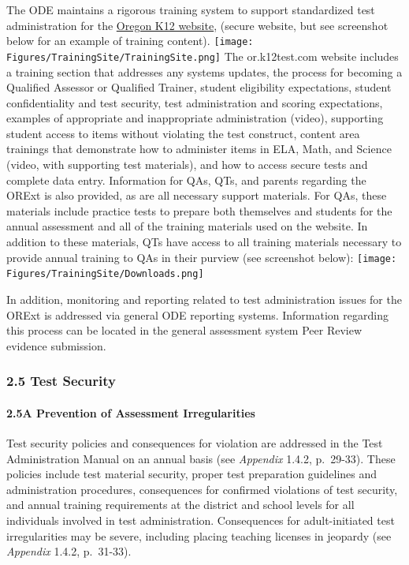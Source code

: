 \documentclass[]{article}
\let\oldparagraph\paragraph
\renewcommand{\paragraph}[1]{\oldparagraph{#1}\mbox{}}
\begin{document}
The ODE maintains a rigorous training system to support standardized
test administration for the \color{link}
\href{https://or.k12test.com}{Oregon K12 website}\color{black}, (secure
website, but see screenshot below for an example of training content).
\FloatBarrier \texttt{[image: Figures/TrainingSite/TrainingSite.png]}
\clearpage The or.k12test.com website includes a training section that
addresses any systems updates, the process for becoming a Qualified
Assessor or Qualified Trainer, student eligibility expectations, student
confidentiality and test security, test administration and scoring
expectations, examples of appropriate and inappropriate administration
(video), supporting student access to items without violating the test
construct, content area trainings that demonstrate how to administer
items in ELA, Math, and Science (video, with supporting test materials),
and how to access secure tests and complete data entry. Information for
QAs, QTs, and parents regarding the ORExt is also provided, as are all
necessary support materials. For QAs, these materials include practice
tests to prepare both themselves and students for the annual assessment
and all of the training materials used on the website. In addition to
these materials, QTs have access to all training materials necessary to
provide annual training to QAs in their purview (see screenshot below):
\FloatBarrier  \texttt{[image: Figures/TrainingSite/Downloads.png]}

In addition, monitoring and reporting related to test administration
issues for the ORExt is addressed via general ODE reporting systems.
Information regarding this process can be located in the general
assessment system Peer Review evidence submission.

\hypertarget{test-security}{%
\subsubsection{2.5 Test Security}\label{test-security}}

\hypertarget{a-prevention-of-assessment-irregularities}{%
\paragraph{2.5A Prevention of Assessment
Irregularities}\label{a-prevention-of-assessment-irregularities}}

Test security policies and consequences for violation are addressed in
the Test Administration Manual on an annual basis (see \emph{Appendix}
1.4.2, p.~29-33). These policies include test material security, proper
test preparation guidelines and administration procedures, consequences
for confirmed violations of test security, and annual training
requirements at the district and school levels for all individuals
involved in test administration. Consequences for adult-initiated test
irregularities may be severe, including placing teaching licenses in
jeopardy (see \emph{Appendix} 1.4.2, p.~31-33).
\end{document}
